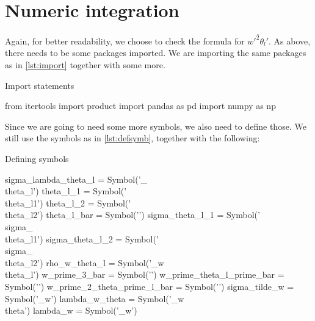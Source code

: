 \section{Numeric integration}\label{sec:numintsympy}

Again, for better readability, we choose to check the formula for $\overline{w'^2\theta_l'}$.
As above, there needs to be some packages imported.
We are importing the same packages as in \cref{lst:import} together with some more.
\begin{listing}[!ht]
    \caption{Import statements}
    \label{lst:importnum}
    \begin{pythoncode}
        from itertools import product
        import pandas as pd
        import numpy as np
    \end{pythoncode}
\end{listing}
Since we are going to need some more symbols, we also need to define those.
We still use the symbols as in \cref{lst:defsymb}, together with the following:
\begin{listing}[!ht]
    \caption{Defining symbols}
    \label{lst:defsymbnum}
    \begin{pythoncode}
        sigma_lambda_theta_l = Symbol('\sigma_{\lambda\\theta_l}')
        theta_l_1 = Symbol('\\theta_{l1}') 
        theta_l_2 = Symbol('\\theta_{l2}')
        theta_l_bar = Symbol('')
        sigma_theta_l_1 = Symbol('\\sigma_{\\theta_{l1}}')
        sigma_theta_l_2 = Symbol('\\sigma_{\\theta_{l2}}')
        rho_w_theta_l = Symbol('\rho_{w\\theta_l}')
        w_prime_3_bar = Symbol('')
        w_prime_theta_l_prime_bar = Symbol('')
        w_prime_2_theta_prime_l_bar = Symbol('')
        sigma_tilde_w = Symbol('\Tilde{\sigma}_w')
        lambda_w_theta = Symbol('\lambda_{w\\theta}')
        lambda_w = Symbol('\lambda_w')
    \end{pythoncode}
\end{listing}


